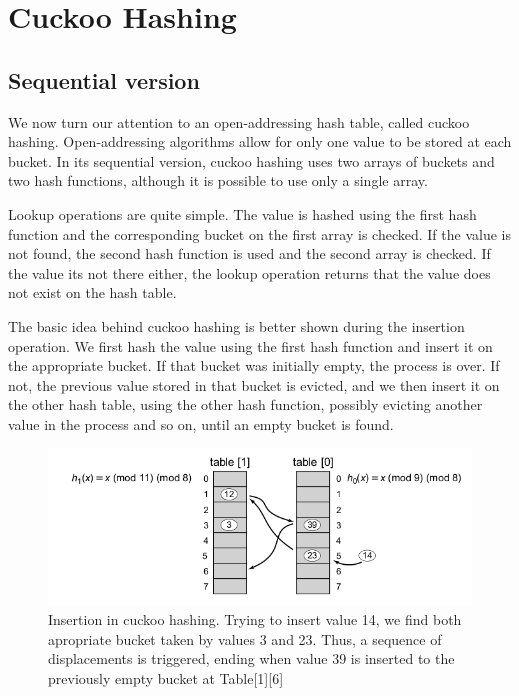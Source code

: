 \section{Cuckoo Hashing}
\subsection{Sequential version}

We now turn our attention to an open-addressing hash table, called cuckoo hashing. Open-addressing algorithms allow for only one value to be stored at each bucket. In its sequential version, cuckoo hashing uses two arrays of buckets and two hash functions, although it is possible to use only a single array. 

Lookup operations are quite simple. The value is hashed using the first hash function and the corresponding bucket on the first array is checked. If the value is not found, the second hash function is used and the second array is  checked.  If the value its not there either, the lookup operation returns that the value does not exist on the hash table.

The basic idea behind cuckoo hashing is better shown during the insertion operation. We first hash the value using the first hash function and insert it on the appropriate bucket. If that bucket was initially empty, the process is over. If not, the previous value stored in that bucket is evicted, and we then insert it  on the other hash table, using the other hash function, possibly evicting another value in the process and so on, until an empty bucket is found.

\begin{figure}
 \centering
  \includegraphics[scale=0.5]{cuckoo_hashing.png}
\caption[Insertion in cuckoo hashing]{Insertion in cuckoo hashing. Trying to insert value 14, we find both apropriate bucket taken by values 3 and 23. Thus, a sequence of displacements is triggered, ending when value 39 is inserted to the previously empty bucket at Table[1][6] }
\end{figure}

